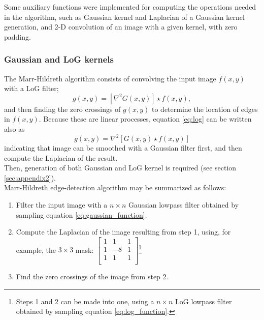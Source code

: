 \documentclass{ipol}
\numberwithin{equation}{section}
\numberwithin{table}{section}
\numberwithin{figure}{section}
\begin{document}
Some auxiliary functions were implemented for computing the operations
needed in the algorithm, such as Gaussian kernel and Laplacian of a Gaussian 
kernel generation, and 2-D convolution of an image with a given kernel, 
with zero padding.


\subsubsection{Gaussian and LoG kernels}

The Marr-Hildreth algorithm consists of convolving the input image $f(x,y)$ with a LoG filter;
\begin{equation}\label{eq:log}
  g(x,y) = [\nabla^2G(x,y)]\star f(x,y), 
\end{equation}
and then finding the zero crossings of $g(x,y)$ to determine the location of edges in $f(x,y)$. 
Because these are linear processes, equation \ref{eq:log} can be written also as
\begin{equation}
  g(x,y) = \nabla^2[G(x,y)\star f(x,y)]
\end{equation}
indicating that image can be smoothed with a Gaussian filter first, and then compute the Laplacian of the result.\\

Then, generation of both Gaussian and LoG kernel is required (see section \ref{sec:appendix2}).\\

Marr-Hildreth edge-detection algorithm may be summarized as follows:
\begin{enumerate}
	\item Filter the input image with a $n \times n$ Gaussian lowpass filter obtained by sampling equation \ref{eq:gaussian_function}.
	\item Compute the Laplacian of the image resulting from step 1, using, for example, the $3\times3$ mask:
			$\begin{bmatrix}
			1 &  1 & 1 \\
			1 & -8 & 1 \\
			1 &  1 & 1 \\
			\end{bmatrix}$\footnote{Steps 1 and 2 can be made into one, using a $n\times n$ LoG lowpass filter obtained by sampling equation \ref{eq:log_function}.}
	\item Find the zero crossings of the image from step 2.
\end{enumerate}
\end{document}
